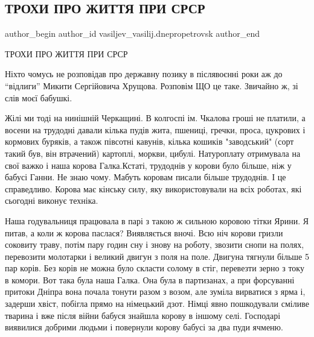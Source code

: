  
 
 
 
 
 
\subsection{ТРОХИ ПРО ЖИТТЯ ПРИ СРСР}
\label{sec:11_08_2021.fb.vasiljev_vasilij.dnepropetrovsk.1.zhittja_v_sssr}
 
\ifcmt
 author_begin
   author_id vasiljev_vasilij.dnepropetrovsk
 author_end
\fi

ТРОХИ ПРО ЖИТТЯ ПРИ СРСР

Ніхто чомусь не розповідав про державну позику в післявоєнні роки аж до
\enquote{відлиги} Микити Сергійовича Хрущова.  Розповім ЩО це таке.  Звичайно ж, зі
слів моєї бабушкі. 

Жілі ми тоді на нинішній Черкащині.  В колгоспі ім.  Чкалова
гроші не платили, а восени на трудодні давали кілька пудів жита, пшениці,
гречки, проса, цукрових і кормових буряків, а також півсотні кавунів, кілька
кошиків "заводський" (сорт такий був, він втрачений) картоплі, моркви, цибулі.
Натуроплату отримувала на свої важко і наша корова Галка.Кстаті, трудоднів у
корови було більше, ніж у бабусі Ганни.  Не знаю чому.  Мабуть коровам писали
більше трудоднів.  І це справедливо.  Корова має кінську силу, яку
використовували на всіх роботах, які сьогодні виконує техніка.  

Наша годувальниця працювала в парі з такою ж сильною коровою тітки Ярини.  Я
питав, а коли ж корова паслася?  Виявляється вночі.  Всю ніч корови гризли
соковиту траву, потім пару годин сну і знову на роботу, звозити снопи на полях,
перевозити молотарки і великий двигун з поля на поле.  Двигуна тягнули більше 5
пар корів.  Без корів не можна було скласти солому в стіг, перевезти зерно з
току в комори. Вот така була наша Галка. Она була в партизанах, а при
форсуванні притоки Дніпра вона почала тонути разом з возом, але зуміла
вирватися з ярма і, задерши хвіст, побігла  прямо на німецький дзот.  Німці
явно пошкодували сміливе тварина і вже після війни бабуся знайшла корову в
іншому селі.  Господарі виявилися добрими людьми і повернули корову бабусі за
два пуди ячменю.  

